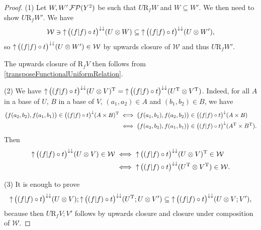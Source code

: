 \begin{proof}
(1) Let $W,W'\operatorname{\mathcal{FP}}(Y^2)$ be such that $U\mathrel{\mathrm{R}_{f}}W$ and $W\subseteq W'$. We then need to show $U\mathrel{\mathrm{R}_{f}}W'$. We have 
\[ \mathcal{W} \ni \operatorname{\uparrow}\big((f|f)\circ t \big)^{\downarrow\downarrow}(U\otimes W) \subseteq \operatorname{\uparrow}\big((f|f)\circ t \big)^{\downarrow\downarrow}(U\otimes W'), \]
so $\operatorname{\uparrow}\big((f|f)\circ t \big)^{\downarrow\downarrow}(U\otimes W') \in \mathcal{W}$ by upwards closure of $\mathcal{W}$ and thus $U\mathrel{\mathrm{R}_{f}}W'$.

The upwards closure of $\mathrel{\mathrm{R}_{f}}V$ then follows from \ref{transposeFunctionalUniformRelation}.

(2) We have $\operatorname{\uparrow}\big((f|f)\circ t \big)^{\downarrow\downarrow}(U\otimes V)^{\mathrm{T}} = \operatorname{\uparrow}\big((f|f)\circ t \big)^{\downarrow\downarrow}(U^{\mathrm{T}}\otimes V^{\mathrm{T}})$. Indeed, for all $A$ in a base of $U$, $B$ in a base of $V$, $(a_1, a_2)\in A$ and $(b_1, b_2)\in B$, we have
\begin{align*}
\big(f(a_2, b_2), f(a_1, b_1)\big) \in \big((f|f)\circ t \big)^{\downarrow}(A\times B)^{\mathrm{T}} &\iff \big(f(a_1, b_1), f(a_2, b_2)\big) \in \big((f|f)\circ t \big)^{\downarrow}(A\times B) \\
&\iff \big(f(a_2, b_2), f(a_1, b_1)\big) \in \big((f|f)\circ t \big)^{\downarrow}(A^{\mathrm{T}}\times B^{\mathrm{T}}).
\end{align*}
Then
\begin{align*}
\operatorname{\uparrow}\big((f|f)\circ t \big)^{\downarrow\downarrow}(U\otimes V) \in \mathcal{W} &\iff \operatorname{\uparrow}\big((f|f)\circ t \big)^{\downarrow\downarrow}(U\otimes V)^{\mathrm{T}} \in \mathcal{W} \\
&\iff \operatorname{\uparrow}\big((f|f)\circ t \big)^{\downarrow\downarrow}(U^{\mathrm{T}}\otimes V^{\mathrm{T}}) \in \mathcal{W}.
\end{align*}

(3) It is enough to prove
\[ \operatorname{\uparrow}\big((f|f)\circ t \big)^{\downarrow\downarrow}(U\otimes V);\operatorname{\uparrow}\big((f|f)\circ t \big)^{\downarrow\downarrow}(U^{\mathrm{T}};U\otimes V') \subseteq \operatorname{\uparrow}\big((f|f)\circ t \big)^{\downarrow\downarrow}(U\otimes V;V'), \]
because then $U\mathrel{\mathrm{R}_{f}} V;V'$ follows by upwards closure and closure under composition of $\mathcal{W}$.


\end{proof}

